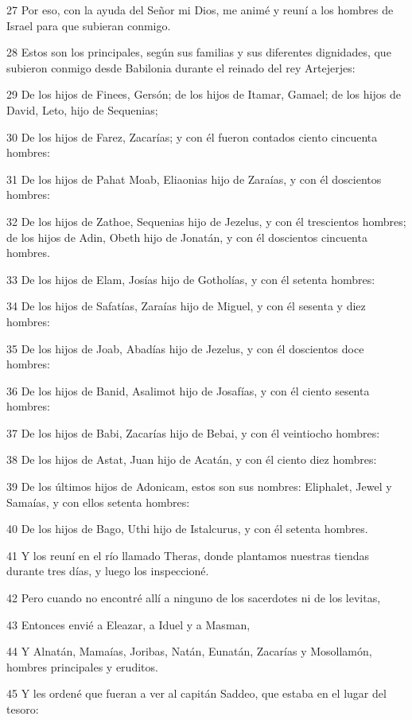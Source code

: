 \par 27 Por eso, con la ayuda del Señor mi Dios, me animé y reuní a los hombres de Israel para que subieran conmigo.
\par 28 Estos son los principales, según sus familias y sus diferentes dignidades, que subieron conmigo desde Babilonia durante el reinado del rey Artejerjes:
\par 29 De los hijos de Finees, Gersón; de los hijos de Itamar, Gamael; de los hijos de David, Leto, hijo de Sequenias;
\par 30 De los hijos de Farez, Zacarías; y con él fueron contados ciento cincuenta hombres:
\par 31 De los hijos de Pahat Moab, Eliaonias hijo de Zaraías, y con él doscientos hombres:
\par 32 De los hijos de Zathoe, Sequenias hijo de Jezelus, y con él trescientos hombres; de los hijos de Adin, Obeth hijo de Jonatán, y con él doscientos cincuenta hombres.
\par 33 De los hijos de Elam, Josías hijo de Gotholías, y con él setenta hombres:
\par 34 De los hijos de Safatías, Zaraías hijo de Miguel, y con él sesenta y diez hombres:
\par 35 De los hijos de Joab, Abadías hijo de Jezelus, y con él doscientos doce hombres:
\par 36 De los hijos de Banid, Asalimot hijo de Josafías, y con él ciento sesenta hombres:
\par 37 De los hijos de Babi, Zacarías hijo de Bebai, y con él veintiocho hombres:
\par 38 De los hijos de Astat, Juan hijo de Acatán, y con él ciento diez hombres:
\par 39 De los últimos hijos de Adonicam, estos son sus nombres: Eliphalet, Jewel y Samaías, y con ellos setenta hombres:
\par 40 De los hijos de Bago, Uthi hijo de Istalcurus, y con él setenta hombres.
\par 41 Y los reuní en el río llamado Theras, donde plantamos nuestras tiendas durante tres días, y luego los inspeccioné.
\par 42 Pero cuando no encontré allí a ninguno de los sacerdotes ni de los levitas,
\par 43 Entonces envié a Eleazar, a Iduel y a Masman,
\par 44 Y Alnatán, Mamaías, Joribas, Natán, Eunatán, Zacarías y Mosollamón, hombres principales y eruditos.
\par 45 Y les ordené que fueran a ver al capitán Saddeo, que estaba en el lugar del tesoro:
